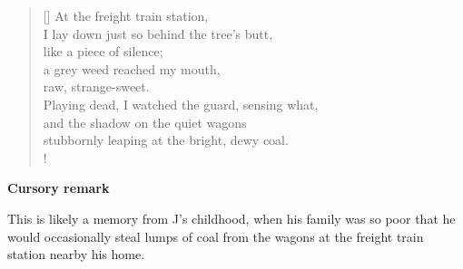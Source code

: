 \documentclass[a4paper,12pt,twoside,final]{book}
\begin{document}
\begin{verse}[\versewidth]
  At the freight train station, \\
  I lay down just so behind the tree's butt, \\
  like a piece of silence; \\
  a grey weed reached my mouth, \\
  raw, strange-sweet. \\
  Playing dead, I watched the guard, sensing what, \\
  and the shadow on the quiet wagons \\
  stubbornly leaping at the bright, dewy coal. \\!
\end{verse}


\bigskip

\noindent \textbf{Cursory remark}

\medskip

This is likely a memory from J's childhood, when his family was so
poor that he would occasionally steal lumps of coal from the wagons at
the freight train station nearby his home.

\newpage

\settowidth{\versewidth}{Csak ami nincs, annak van bokra,}
\end{document}
